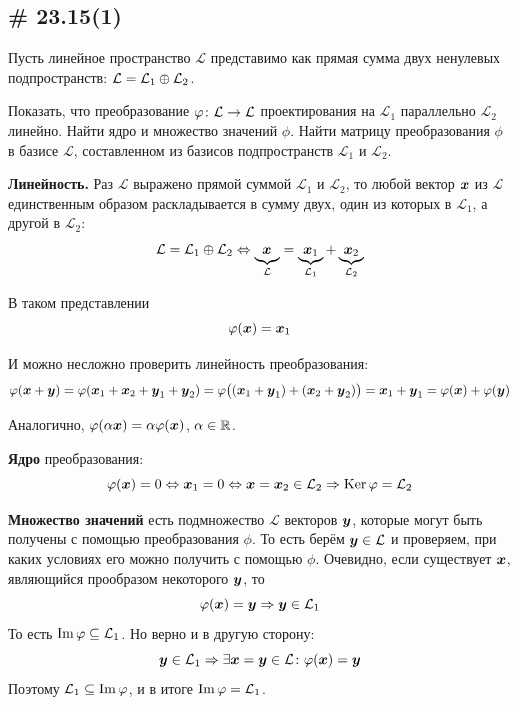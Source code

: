 \documentclass[a4paper,12pt]{article}
\DeclareMathOperator{\Imag}{Im}
\begin{document}
  
  \subsection{\# 23.15(1)}
  
  Пусть линейное пространство $\mathcal L$ представимо как прямая сумма двух ненулевых подпространств: $\mathcal L \hm= \mathcal L_1 \oplus \mathcal L_2$.
  
  Показать, что преобразование $\phi\colon \mathcal L \hm\to \mathcal L$ проектирования на $\mathcal L_1$ параллельно $\mathcal L_2$ линейно.
  Найти ядро и множество значений $\phi$.
  Найти матрицу преобразования $\phi$ в базисе $\mathcal L$, составленном из базисов подпространств $\mathcal L_1$ и $\mathcal L_2$.
  
  \begin{solution}
    \textbf{Линейность.} Раз $\mathcal L$ выражено прямой суммой $\mathcal L_1$ и $\mathcal L_2$, то любой вектор $\boldsymbol x$ из $\mathcal L$ единственным образом раскладывается в сумму двух, один из которых в $\mathcal L_1$, а другой в $\mathcal L_2$:
    \[
      \mathcal L = \mathcal L_1 \oplus \mathcal L_2
      \Leftrightarrow \underbrace{\boldsymbol x_{\vphantom{1}}}_{\mathcal L} = \underbrace{\boldsymbol x_1}_{\mathcal L_1} + \underbrace{\boldsymbol x_2}_{\mathcal L_2} 
    \]  %
    
    В таком представлении
    \[
      \varphi(\boldsymbol x) = \boldsymbol x_1
    \]
    
    И можно несложно проверить линейность преобразования:
    \[
      \varphi(\boldsymbol x + \boldsymbol y) = \varphi(\boldsymbol x_1 + \boldsymbol x_2 + \boldsymbol y_1 + \boldsymbol y_2)
      = \varphi\bigl((\boldsymbol x_1 + \boldsymbol y_1) + (\boldsymbol x_2 + \boldsymbol y_2)\bigr)
      = \boldsymbol x_1 + \boldsymbol y_1 = \varphi(\boldsymbol x) + \varphi(\boldsymbol y)
    \]
    
    Аналогично, $\phi(\alpha \bds x) \hm= \alpha \phi(\bds x)$, $\alpha \hm\in \RR$.
    
    \medskip
    
    \textbf{Ядро} преобразования:
    \[
      \phi(\bds x) = 0 \Leftrightarrow \bds x_1 = 0 \Leftrightarrow \bds x = \bds x_2 \in \mathcal L_2 \Rightarrow \Ker\phi \hm= \mathcal L_2
    \]
    
    \medskip
    
    \textbf{Множество значений} есть подмножество $\mathcal L$ векторов $\boldsymbol y$, которые могут быть получены с помощью преобразования $\phi$.
    То есть берём $\bds y \hm\in \mathcal L$ и проверяем, при каких условиях его можно получить с помощью $\phi$.
    Очевидно, если существует $\boldsymbol x$, являющийся прообразом некоторого $\boldsymbol y$, то
    \[
      \varphi(\boldsymbol x) = \boldsymbol y \Rightarrow \boldsymbol y \in \mathcal L_1
    \]
    То есть $\Imag\phi \hm{\subseteq} \mathcal L_1$.
    Но верно и в другую сторону:
    \[
      \boldsymbol y \in \mathcal L_1 \Rightarrow \exists \boldsymbol x = \boldsymbol y \in \mathcal L\colon \varphi(\boldsymbol x) = \boldsymbol y
    \]
    Поэтому $\mathcal L_1 \hm{\subseteq} \Imag\phi$, и в итоге $\Imag\phi \hm= \mathcal L_1$.
    

\end{solution}
\end{document}
